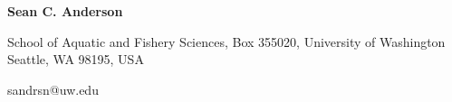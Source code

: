 \documentclass[10pt]{article}
\title{}
\author{}
\date{}
\begin{document}
\begin{spacing}{1}
\thispagestyle{empty}

{\LARGE \textbf{Sean C. Anderson}}\\
\vspace{-1.0mm}

School of Aquatic and Fishery Sciences,
Box 355020, University of Washington
Seattle, WA 98195, USA

sandrsn@uw.edu\\

\vspace{-4.5mm}



\end{spacing}
\end{document}
